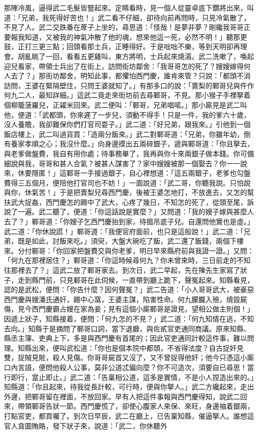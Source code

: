 那陣冷風，逼得武二毛髮皆豎起來。定睛看時，見一個人從靈卓底下鑽將出來，叫道：「兄弟，我死得好苦也！」武二看不仔細，卻待向前再問時，只見冷氣散了，不見了人。武二交跌番在蓆子上坐的，尋思道：「怪哉！是夢非夢？剛纔我哥哥正要報我知道，又被我的神氣冲散了他的魂，想來他這一死，必然不明！」聽那更鼓，正打三更三點；回頭看那士兵，正睡得好。于是咄咄不樂，等到天明卻再理會。胡亂眺了一回，看看五更雞叫，東方將明，士兵起來燒湯。武二洗嗽了，喚起迎兒看家，帶領士兵出了在街上，訪問街坊鄰舍：「我哥哥怎的死了？嫂嫂嫁得何人去了？」那街坊鄰舍，明知此事，都懼怕西門慶，誰肯來管？只說：「都頭不消訪問，王婆在緊隔壁住，只問王婆就知了。」有那多口的說：「賣梨的鄆哥兒與仵作何九二人，最知詳細。」這武二竟走來街坊前去尋鄆哥，不見。那小猴子手裡拏着個柳籠菠羅兒，正糴米回來。武二便叫：「鄆哥，兄弟唱喏。」那小廝見是武二叫他，便道：「武都頭，你來遲了一步兒，須動不得手！只是一件，我的爹六十歲，沒人養贍，我卻難保你們打官司耍子。」武二道：「好兄弟，跟我來。」引他到一個飯店樓上，武二叫過貨買：「造兩分飯來。」武二對鄆哥道：「兄弟，你雖年幼，倒有養家孝順之心；我沒什麼。」向身邊摸出五兩碎銀子，遞與鄆哥道：「你且拏去，與老爹做盤費，我自有用你處；待事務畢了，我再與你十來兩銀子做本錢。你可備細說與我，哥哥和甚人合氣？被甚人謀害了？家中嫂嫂被那一個娶去？你一一說來，休要隱匿！」這鄆哥一手接過銀子，自心裡想道：「這五兩銀子，老爹也勾盤費得三五個月，便陪他打官司也不妨！」一面說道：「武二哥，你聽我說。只怕說與你，休氣苦！」于是把賣梨兒尋西門慶，後被王婆怎地打，不放進去，又怎的幫扶武大捉姦，西門慶怎的踢中了武大，心疼了幾日，不知怎的死了，從頭至尾，訴說了一遍。武二聽了，便道：「你這話說是實麼？」又問道：「我的嫂子嫁與甚麼人去了？」鄆哥道：「你嫂子乞西門慶抬到家，待搗吊底子兒。自還問他實也是虛。」武二道：「你休說謊！」鄆哥道：「我便官府面前，也只是這般說！」武二道：「兄弟，既是如此，討飯來吃。」須臾，大盤大碗吃了飯，武二還了飯錢，兩個下樓來。分付鄆哥：「你回家把盤費交與你老爹，明日早來縣府前與我證一證。」又問：「何九在那裡居住？」鄆哥道：「你這時候尋何九？你未曾來時，三日前走的不知往那裡去了？」這武二放了鄆哥家去。到次日，武二早起，先在陳先生家寫了狀子，走到縣門前，只見鄆哥在此伺候，一直帶到廳上跪下，聲冤起來。知縣看見，認的是武松，便問：「你告什麼？因何聲冤？」武二告道：「小人哥哥武大，被豪惡西門慶與嫂潘氏通奸，踢中心窩，王婆主謀，陷害性命。何九朦朧入殮，燒毀屍傷，見今西門慶霸占嫂在家為妾；見有這個小廝鄆哥是證見，望相公做主則個！」因遞上狀子，知縣接着，便問：「何九怎的不見？」武二道：「何九知情在逃，不知去向。」知縣于是摘問了鄆哥口詞，當下退廳，與佐貳官吏通同商議。原來知縣、縣丞主簿、吏典上下，多是與西門慶有首尾的；因此官吏通同計較這件事，難以問理。知縣出來，便叫武松道：「你也是個本院中都頭，不省得法度？自古捉奸見雙，捉賊見賍，殺人見傷。你哥哥屍首又沒了，又不曾捉得他奸；他今只憑這小廝口內言語，便問他殺人公事，莫非公道忒偏向麼？你不可造次，須要自已尋思！當行即行，當止即止。」武二道：「告稟相公道，這多是實情，不是小人捏造出來的。」知縣道：「你且起來，待我從長計較，可行時，便與你拏人。」武二方纔起來，走出外邊，把鄆哥留在裡面，不放回家。早有人把這件事報與西門慶得知，說武二回來，帶領鄆哥告狀一節。西門慶慌了，卻使心腹家人來保、來旺，身邊袖着銀兩，打點官吏，都買囑了。到次日早辰，武二在廳上，已告稟知縣，催逼拏人。誰想這官人貪圖賄賂，發下狀子來，說道：「武二，你休聽外